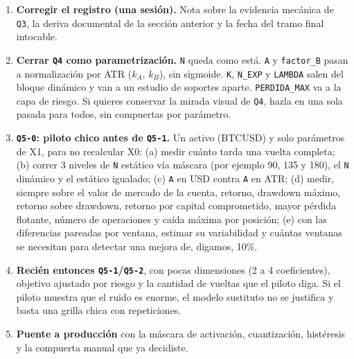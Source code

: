 \documentclass[11pt,a4paper]{article}
\newcommand{\code}[1]{\texttt{\small #1}}
\begin{document}
\begin{enumerate}[leftmargin=1.4em]
  \item \textbf{Corregir el registro (una sesión).} Nota sobre la evidencia mecánica de \code{Q3}, la
        deriva documental de la sección anterior y la fecha del tramo final intocable.
  \item \textbf{Cerrar \code{Q4} como parametrización.} \code{N} queda como está. \code{A} y
        \code{factor\_B} pasan a normalización por ATR ($k_A$, $k_B$), sin sigmoide. \code{K},
        \code{N\_EXP} y \code{LAMBDA} salen del bloque dinámico y van a un estudio de soportes aparte.
        \code{PERDIDA\_MAX} va a la capa de riesgo. Si quieres conservar la mirada visual de \code{Q4},
        hazla en una sola pasada para todos, sin compuertas por parámetro.
  \item \textbf{\code{Q5-0}: piloto chico antes de \code{Q5-1}.} Un activo (BTCUSD) y solo parámetros de
        X1, para no recalcular X0: (a) medir cuánto tarda una vuelta completa; (b) correr 3 niveles de
        \code{N} estático vía máscara (por ejemplo 90, 135 y 180), el \code{N} dinámico y el estático
        igualado; (c) \code{A} en USD contra \code{A} en ATR; (d) medir, siempre sobre el valor de mercado de la cuenta,
        retorno, drawdown máximo, retorno sobre drawdown, retorno por capital comprometido, mayor pérdida
        flotante, número de operaciones y caída máxima por posición; (e) con las diferencias pareadas por ventana, estimar su variabilidad y cuántas ventanas
        se necesitan para detectar una mejora de, digamos, 10\%.
  \item \textbf{Recién entonces \code{Q5-1}/\code{Q5-2}}, con pocas dimensiones (2 a 4 coeficientes),
        objetivo ajustado por riesgo y la cantidad de vueltas que el piloto diga. Si el piloto muestra que
        el ruido es enorme, el modelo sustituto no se justifica y basta una grilla chica con repeticiones.
  \item \textbf{Puente a producción} con la máscara de activación, cuantización, histéresis y la compuerta
        manual que ya decidiste.
\end{enumerate}
\end{document}
